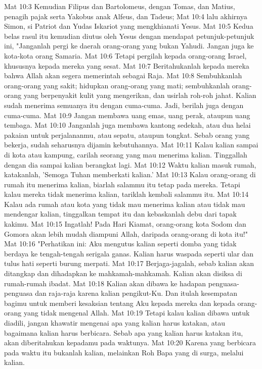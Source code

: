 Mat 10:3  Kemudian Filipus dan Bartolomeus, dengan Tomas, dan Matius, penagih pajak serta Yakobus anak Alfeus, dan Tadeus;
Mat 10:4  lalu akhirnya Simon, si Patriot dan Yudas Iskariot yang mengkhianati Yesus.
Mat 10:5  Kedua belas rasul itu kemudian diutus oleh Yesus dengan mendapat petunjuk-petunjuk ini, "Janganlah pergi ke daerah orang-orang yang bukan Yahudi. Jangan juga ke kota-kota orang Samaria.
Mat 10:6  Tetapi pergilah kepada orang-orang Israel, khususnya kepada mereka yang sesat.
Mat 10:7  Beritahukanlah kepada mereka bahwa Allah akan segera memerintah sebagai Raja.
Mat 10:8  Sembuhkanlah orang-orang yang sakit; hidupkan orang-orang yang mati; sembuhkanlah orang-orang yang berpenyakit kulit yang mengerikan, dan usirlah roh-roh jahat. Kalian sudah menerima semuanya itu dengan cuma-cuma. Jadi, berilah juga dengan cuma-cuma.
Mat 10:9  Jangan membawa uang emas, uang perak, ataupun uang tembaga.
Mat 10:10  Janganlah juga membawa kantong sedekah, atau dua helai pakaian untuk perjalananmu, atau sepatu, ataupun tongkat. Sebab orang yang bekerja, sudah seharusnya dijamin kebutuhannya.
Mat 10:11  Kalau kalian sampai di kota atau kampung, carilah seorang yang mau menerima kalian. Tinggallah dengan dia sampai kalian berangkat lagi.
Mat 10:12  Waktu kalian masuk rumah, katakanlah, 'Semoga Tuhan memberkati kalian.'
Mat 10:13  Kalau orang-orang di rumah itu menerima kalian, biarlah salammu itu tetap pada mereka. Tetapi kalau mereka tidak menerima kalian, tariklah kembali salammu itu.
Mat 10:14  Kalau ada rumah atau kota yang tidak mau menerima kalian atau tidak mau mendengar kalian, tinggalkan tempat itu dan kebaskanlah debu dari tapak kakimu.
Mat 10:15  Ingatlah! Pada Hari Kiamat, orang-orang kota Sodom dan Gomora akan lebih mudah diampuni Allah, daripada orang-orang di kota itu!"
Mat 10:16  "Perhatikan ini: Aku mengutus kalian seperti domba yang tidak berdaya ke tengah-tengah serigala ganas. Kalian harus waspada seperti ular dan tulus hati seperti burung merpati.
Mat 10:17  Berjaga-jagalah, sebab kalian akan ditangkap dan dihadapkan ke mahkamah-mahkamah. Kalian akan disiksa di rumah-rumah ibadat.
Mat 10:18  Kalian akan dibawa ke hadapan penguasa-penguasa dan raja-raja karena kalian pengikut-Ku. Dan itulah kesempatan bagimu untuk memberi kesaksian tentang Aku kepada mereka dan kepada orang-orang yang tidak mengenal Allah.
Mat 10:19  Tetapi kalau kalian dibawa untuk diadili, jangan khawatir mengenai apa yang kalian harus katakan, atau bagaimana kalian harus berbicara. Sebab apa yang kalian harus katakan itu, akan diberitahukan kepadamu pada waktunya.
Mat 10:20  Karena yang berbicara pada waktu itu bukanlah kalian, melainkan Roh Bapa yang di surga, melalui kalian.
